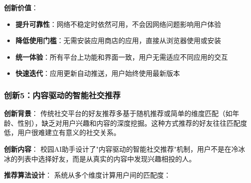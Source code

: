 \documentclass[12pt,a4paper]{article}
\begin{document}
\textbf{创新价值}：
\begin{itemize}
    \item \textbf{提升可靠性}：网络不稳定时依然可用，不会因网络问题影响用户体验
    \item \textbf{降低使用门槛}：无需安装应用商店的应用，直接从浏览器使用或安装
    \item \textbf{统一体验}：所有平台上功能和界面一致，用户无需适应不同应用的交互
    \item \textbf{快速迭代}：应用更新自动推送，用户始终使用最新版本
\end{itemize}

\subsubsection{创新5：内容驱动的智能社交推荐}

\textbf{创新背景}：
传统社交平台的好友推荐多基于随机推荐或简单的维度匹配（如年龄、性别），缺乏对用户兴趣和内容的深度挖掘。这种方式推荐的好友往往匹配度低，用户很难建立有意义的社交关系。

\textbf{创新内容}：
校园AI助手设计了"内容驱动的智能社交推荐"机制，用户不是在冷冰冰的列表中选择好友，而是从真实的内容中发现兴趣相投的人。

\textbf{推荐算法设计}：
系统从多个维度计算用户间的匹配度：
\end{document}
